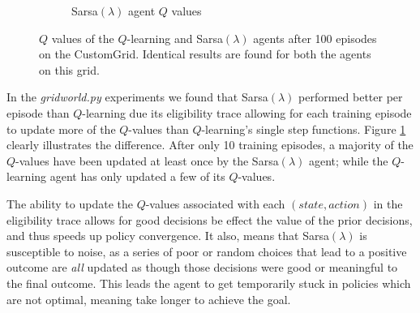 \documentclass[10pt,conference]{IEEEtran}
\begin{document}
\begin{figure}[h]
\begin{subfigure}[b]{0.40\textwidth}
			\caption{Sarsa\((\lambda)\) agent \(Q\) values}
		\end{subfigure}
		\caption{\(Q\) values of the \(Q\)-learning and Sarsa\((\lambda)\) agents 
		after 100 episodes on the CustomGrid. Identical results are found for both the agents on this grid.}
		\label{qvalues}
	\end{figure}

	In the \textit{gridworld.py} experiments we found that Sarsa\((\lambda)\) 
	performed better per episode than \(Q\)-learning due its eligibility trace allowing for
	each training episode to update more of the \(Q\)-values than \(Q\)-learning's
	single step functions. Figure \ref{qvalues} clearly illustrates the difference. 
	After only 10 training episodes, a majority of the \(Q\)-values have been
	updated at least once by the Sarsa\((\lambda)\) agent; while the \(Q\)-learning
	agent has only updated a few of its \(Q\)-values.

	The ability to update the \(Q\)-values associated with each \((state,action)\) 
	in the eligibility trace allows for good decisions be effect the value of the 
	prior decisions, and thus speeds up policy convergence.  It also, means that
	Sarsa\((\lambda)\) is susceptible to noise, as a series of poor or random choices 
	that lead to a positive outcome are \textit{all} updated as though those 
	decisions were good or meaningful to the final outcome.  This leads the agent
	to get temporarily stuck in policies which are not optimal, meaning take longer
	to achieve the goal.
\end{document}
